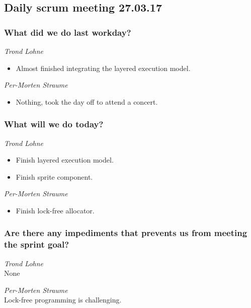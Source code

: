 \documentclass{article}
\begin{document}
\begin{center}
\subsection*{Daily scrum meeting 27.03.17}
\end{center}
\bigskip


\subsubsection*{What did we do last workday?}

\noindent\textit{Trond Lohne}
\begin{itemize}
	\item 
	Almost finished integrating the layered execution model.
\end{itemize}

\medskip

\noindent\textit{Per-Morten Straume}
\begin{itemize}
	\item 
	Nothing, took the day off to attend a concert.
\end{itemize}


\subsubsection*{What will we do today?}

\noindent\textit{Trond Lohne}
\begin{itemize}
	\item 
	Finish layered execution model.
	
	\item 
	Finish sprite component.
\end{itemize}

\medskip

\noindent\textit{Per-Morten Straume}
\begin{itemize}
	\item 
	Finish lock-free allocator.
\end{itemize}


\subsubsection*{Are there any impediments that prevents us from meeting the sprint goal?}

\noindent\textit{Trond Lohne}\\
None

\medskip

\noindent\textit{Per-Morten Straume}\\
Lock-free programming is challenging.
\end{document}
